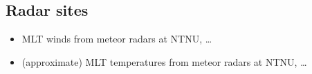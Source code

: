 \subsection{Radar sites}
\begin{itemize}
  \item MLT winds from meteor radars at NTNU, \ldots
  \item (approximate) MLT temperatures from meteor radars at NTNU, \ldots
\end{itemize}